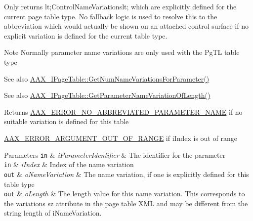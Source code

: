 Only returns {\ttfamily lt;Control\+Name\+Variationslt;} which are explicitly defined for the current page table type. No fallback logic is used to resolve this to the abbreviation which would actually be shown on an attached control surface if no explicit variation is defined for the current table type.

\begin{DoxyNote}{Note}
Normally parameter name variations are only used with the {\ttfamily \textquotesingle{}Pg\+T\+L\textquotesingle{}} table type
\end{DoxyNote}

\begin{DoxyItemize}
\item \begin{DoxySeeAlso}{See also}
\hyperlink{a00107_af8be797a3ec7ed3117e720dd29ea7cc7}{A\+A\+X\+\_\+\+I\+Page\+Table\+::\+Get\+Num\+Name\+Variations\+For\+Parameter()}
\end{DoxySeeAlso}

\item \begin{DoxySeeAlso}{See also}
\hyperlink{a00107_a6ddd61f6ba18b8be8141363d5234ed9d}{A\+A\+X\+\_\+\+I\+Page\+Table\+::\+Get\+Parameter\+Name\+Variation\+Of\+Length()}
\end{DoxySeeAlso}
\begin{DoxyReturn}{Returns}
\hyperlink{a00207_a5f8c7439f3a706c4f8315a9609811937ab7383b0169f6dfa5f86b1fefd6c58ae2}{A\+A\+X\+\_\+\+E\+R\+R\+O\+R\+\_\+\+N\+O\+\_\+\+A\+B\+B\+R\+E\+V\+I\+A\+T\+E\+D\+\_\+\+P\+A\+R\+A\+M\+E\+T\+E\+R\+\_\+\+N\+A\+M\+E} if no suitable variation is defined for this table

\hyperlink{a00207_a5f8c7439f3a706c4f8315a9609811937a8dd2fdd469583a046765eae9178678a3}{A\+A\+X\+\_\+\+E\+R\+R\+O\+R\+\_\+\+A\+R\+G\+U\+M\+E\+N\+T\+\_\+\+O\+U\+T\+\_\+\+O\+F\+\_\+\+R\+A\+N\+G\+E} if {\ttfamily i\+Index} is out of range
\end{DoxyReturn}

\begin{DoxyParams}[1]{Parameters}
\mbox{\tt in}  & {\em i\+Parameter\+Identifier} & The identifier for the parameter \\
\hline
\mbox{\tt in}  & {\em i\+Index} & Index of the name variation \\
\hline
\mbox{\tt out}  & {\em o\+Name\+Variation} & The name variation, if one is explicitly defined for this table type \\
\hline
\mbox{\tt out}  & {\em o\+Length} & The length value for this name variation. This corresponds to the variation\textquotesingle{}s {\ttfamily sz} attribute in the page table X\+M\+L and may be different from the string length of {\ttfamily i\+Name\+Variation}. \\
\hline
\end{DoxyParams}

\end{DoxyItemize}

